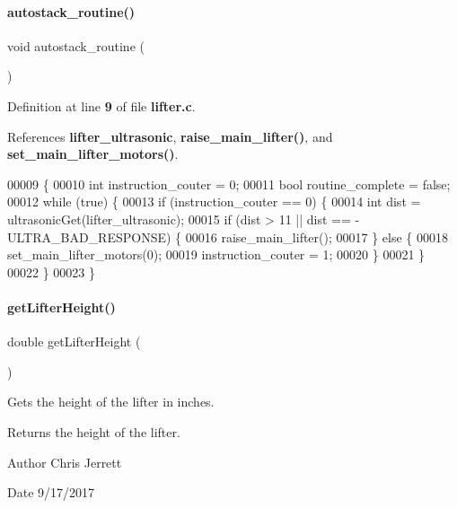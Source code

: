 \paragraph{autostack\+\_\+routine()}
{\footnotesize\ttfamily void autostack\+\_\+routine (\begin{DoxyParamCaption}{ }\end{DoxyParamCaption})}



Definition at line \textbf{ 9} of file \textbf{ lifter.\+c}.



References \textbf{ lifter\+\_\+ultrasonic}, \textbf{ raise\+\_\+main\+\_\+lifter()}, and \textbf{ set\+\_\+main\+\_\+lifter\+\_\+motors()}.


\begin{DoxyCode}
00009                          \{
00010   \textcolor{keywordtype}{int} instruction\_couter = 0;
00011   \textcolor{keywordtype}{bool} routine\_complete = \textcolor{keyword}{false};
00012   \textcolor{keywordflow}{while} (\textcolor{keyword}{true}) \{
00013     \textcolor{keywordflow}{if} (instruction\_couter == 0) \{
00014       \textcolor{keywordtype}{int} dist = ultrasonicGet(lifter_ultrasonic);
00015       \textcolor{keywordflow}{if} (dist > 11 || dist == -ULTRA\_BAD\_RESPONSE) \{
00016         raise_main_lifter();
00017       \} \textcolor{keywordflow}{else} \{
00018         set_main_lifter_motors(0);
00019         instruction\_couter = 1;
00020       \}
00021     \}
00022   \}
00023 \}
\end{DoxyCode}
\mbox{\label{a00107_a2719740958fd8a5926f88f6194e820e3}} 
\paragraph{get\+Lifter\+Height()}
{\footnotesize\ttfamily double get\+Lifter\+Height (\begin{DoxyParamCaption}{ }\end{DoxyParamCaption})}



Gets the height of the lifter in inches. 

\begin{DoxyReturn}{Returns}
the height of the lifter. 
\end{DoxyReturn}
\begin{DoxyAuthor}{Author}
Chris Jerrett 
\end{DoxyAuthor}
\begin{DoxyDate}{Date}
9/17/2017 
\end{DoxyDate}



